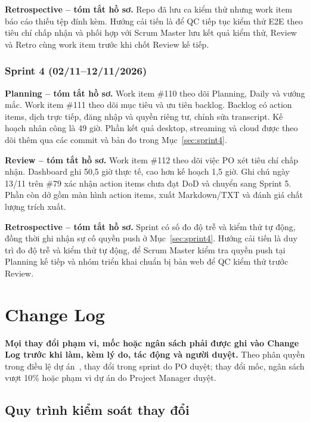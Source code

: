 \documentclass[12pt,a4paper]{report}
\begin{document}
\textbf{Retrospective -- tóm tắt hồ sơ.} Repo đã lưu ca kiểm thử nhưng work item báo cáo thiếu tệp đính kèm.
Hướng cải tiến là để QC tiếp tục kiểm thử E2E theo tiêu chí chấp nhận và phối hợp với Scrum Master lưu kết quả
kiểm thử, Review và Retro cùng work item trước khi chốt Review kế tiếp.

\subsection*{Sprint 4 (02/11--12/11/2026)}

\textbf{Planning -- tóm tắt hồ sơ.} Work item \#110 theo dõi Planning, Daily và vướng mắc. Work item \#111
theo dõi mục tiêu và ưu tiên backlog. Backlog có action items, dịch trực tiếp, đăng nhập và quyền riêng tư,
chỉnh sửa transcript. Kế hoạch nhân công là 49 giờ. Phần kết quả desktop, streaming và cloud được theo dõi
thêm qua các commit và bản đo trong Mục~\ref{sec:sprint4}.

\textbf{Review -- tóm tắt hồ sơ.} Work item \#112 theo dõi việc PO xét tiêu chí chấp nhận. Dashboard ghi 50,5 giờ
thực tế, cao hơn kế hoạch 1,5 giờ. Ghi chú ngày 13/11 trên \#79 xác nhận action items chưa đạt DoD và chuyển
sang Sprint 5. Phần còn dở
gồm màn hình action items, xuất Markdown/TXT và đánh giá chất lượng trích xuất.

\textbf{Retrospective -- tóm tắt hồ sơ.} Sprint có số đo độ trễ và kiểm thử tự động, đồng thời ghi nhận sự cố
quyền push ở Mục~\ref{sec:sprint4}. Hướng cải tiến là duy trì đo độ trễ và kiểm thử tự động, để Scrum Master
kiểm tra quyền push tại Planning kế tiếp và nhóm triển khai chuẩn bị bản web để QC kiểm thử trước Review.

\chapter{Change Log}
\label{chap:changelog}

\textbf{Mọi thay đổi phạm vi, mốc hoặc ngân sách phải được ghi vào Change Log trước khi làm, kèm lý do, tác động và
người duyệt.} Theo phân quyền trong điều lệ dự án~\cite{pid}, thay đổi trong sprint do PO duyệt; thay đổi mốc, ngân
sách vượt 10\% hoặc phạm vi dự án do Project Manager duyệt.

\section{Quy trình kiểm soát thay đổi}
\end{document}
